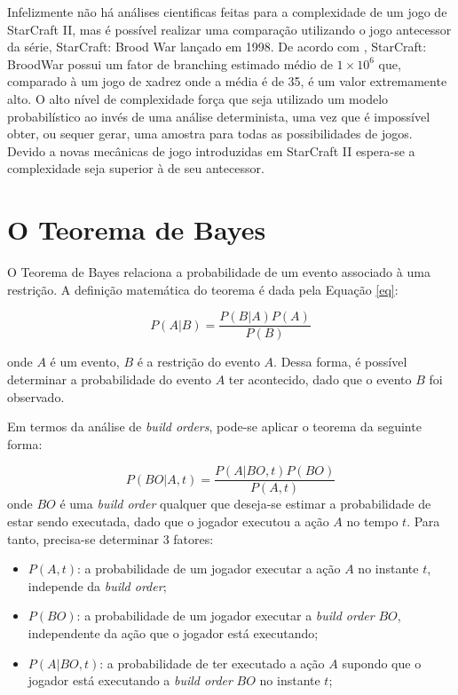 Infelizmente não há análises cientificas feitas para a complexidade de um jogo de StarCraft II, mas é possível realizar uma comparação utilizando o jogo antecessor da série, StarCraft: Brood War lançado em 1998. De acordo com \cite{weber2009data}, StarCraft: BroodWar possui um fator de branching estimado médio de $1 \times 10^6$ que, comparado à um jogo de xadrez onde a média é de 35, é um valor extremamente alto. O alto nível de complexidade força que seja utilizado um modelo probabilístico ao invés de uma análise determinista, uma vez que é impossível obter, ou sequer gerar, uma amostra para todas as possibilidades de jogos. Devido a novas mecânicas de jogo introduzidas em StarCraft II espera-se a complexidade seja superior à de seu antecessor.

		\section{O Teorema de Bayes}
O Teorema de Bayes relaciona a probabilidade de um evento associado à uma restrição. A definição matemática do teorema é dada pela Equação \ref{eq}:

\begin{equation}
	P(A|B) = \frac{P(B|A)P(A)}{P(B)}
\end{equation}

\noindent onde $A$ é um evento, $B$ é a restrição do evento $A$. Dessa forma, é possível determinar a probabilidade do evento $A$ ter acontecido, dado que o evento $B$ foi observado.

Em termos da análise de \textit{build orders}, pode-se aplicar o teorema da seguinte forma:

\begin{equation}
	P(BO|A, t) = \frac{P(A|BO, t)P(BO)}{P(A, t)}
\end{equation}
\noindent onde $BO$ é uma \textit{build order} qualquer que deseja-se estimar a probabilidade de estar sendo executada, dado que o jogador executou a ação $A$ no tempo $t$. Para tanto, precisa-se determinar 3 fatores:

\begin{itemize}
	\item $P(A, t)$: a probabilidade de um jogador executar a ação $A$ no instante $t$, independe da \textit{build order};
	\item $P(BO)$: a probabilidade de um jogador executar a \textit{build order} $BO$, independente da ação que o jogador está executando;
	\item $P(A|BO, t)$: a probabilidade de ter executado a ação $A$ supondo que o jogador está executando a \textit{build order} $BO$ no instante $t$;
\end{itemize}

